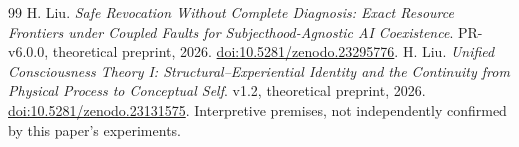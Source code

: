 \begin{thebibliography}{99}
 H. Liu. \emph{Safe Revocation Without Complete Diagnosis: Exact Resource Frontiers under Coupled Faults for Subjecthood-Agnostic AI Coexistence}. PR-v6.0.0, theoretical preprint, 2026. \href{https://doi.org/10.5281/zenodo.23295776}{doi:10.5281/zenodo.23295776}.
 H. Liu. \emph{Unified Consciousness Theory I: Structural--Experiential Identity and the Continuity from Physical Process to Conceptual Self}. v1.2, theoretical preprint, 2026. \href{https://doi.org/10.5281/zenodo.23131575}{doi:10.5281/zenodo.23131575}. Interpretive premises, not independently confirmed by this paper's experiments.
\end{thebibliography}

